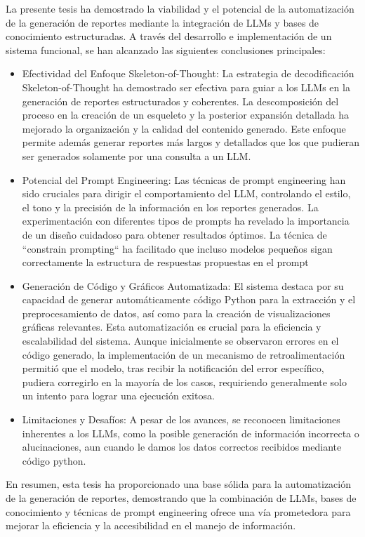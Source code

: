 \begin{conclusions}
    La presente tesis ha demostrado la viabilidad y el potencial de la automatización de la generación de reportes mediante la integración de LLMs y bases de conocimiento estructuradas. A través del desarrollo e implementación de un sistema funcional, se han alcanzado las siguientes conclusiones principales:
    \begin{itemize}
    \item{Efectividad del Enfoque Skeleton-of-Thought:} La estrategia de decodificación Skeleton-of-Thought ha demostrado ser efectiva para guiar a los LLMs en la generación de reportes estructurados y coherentes. La descomposición del proceso en la creación de un esqueleto y la posterior expansión detallada ha mejorado la organización y la calidad del contenido generado. Este enfoque permite además generar reportes más largos y detallados que los que pudieran ser generados solamente por una consulta a un LLM.
    
    \item{Potencial del Prompt Engineering:} Las técnicas de prompt engineering han sido cruciales para dirigir el comportamiento del LLM, controlando el estilo, el tono y la precisión de la información en los reportes generados. La experimentación con diferentes tipos de prompts ha revelado la importancia de un diseño cuidadoso para obtener resultados óptimos. La técnica de ``constrain prompting`` ha facilitado que incluso modelos pequeños sigan correctamente la estructura de respuestas propuestas en el prompt
    
	\item{Generación de Código y Gráficos Automatizada:}  El sistema destaca por su capacidad de generar automáticamente código Python para la extracción y el preprocesamiento de datos, así como para la creación de visualizaciones gráficas relevantes. Esta automatización es crucial para la eficiencia y escalabilidad del sistema. Aunque inicialmente se observaron errores en el código generado, la implementación de un mecanismo de retroalimentación permitió que el modelo, tras recibir la notificación del error específico, pudiera corregirlo en la mayoría de los casos, requiriendo generalmente solo un intento para lograr una ejecución exitosa.
    
    \item{Limitaciones y Desafíos:} A pesar de los avances, se reconocen limitaciones inherentes a los LLMs, como la posible generación de información incorrecta o alucinaciones, aun cuando le damos los datos correctos recibidos mediante código python.
\end{itemize}
    En resumen, esta tesis ha proporcionado una base sólida para la automatización de la generación de reportes, demostrando que la combinación de LLMs, bases de conocimiento y técnicas de prompt engineering ofrece una vía prometedora para mejorar la eficiencia y la accesibilidad en el manejo de información.
    
\end{conclusions}
